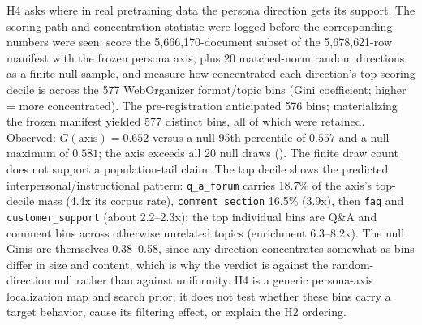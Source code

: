 H4 asks where in real pretraining data the persona direction gets its
support. The scoring path and concentration statistic were logged before
the corresponding numbers were seen: score the 5{,}666{,}170-document subset
of the 5{,}678{,}621-row manifest with the frozen persona axis, plus 20
matched-norm random directions as a finite null sample, and measure how
concentrated each direction's top-scoring decile is across the 577
WebOrganizer format/topic bins (Gini coefficient; higher = more
concentrated). The pre-registration anticipated 576 bins; materializing the
frozen manifest yielded 577 distinct bins, all of which were retained.
Observed: $G(\text{axis}) = 0.652$ versus a null 95th
percentile of $0.557$ and a null maximum of $0.581$; the axis exceeds all 20
null draws (). The finite draw count does not support a
population-tail claim. The top decile shows the predicted
interpersonal/instructional pattern: \texttt{q\_a\_forum} carries 18.7\%
of the axis's top-decile mass (4.4x its corpus rate),
\texttt{comment\_section} 16.5\% (3.9x), then \texttt{faq} and
\texttt{customer\_support} (about 2.2--2.3x); the top individual bins are
Q\&A and comment bins across otherwise unrelated topics (enrichment
6.3--8.2x). The null Ginis are themselves 0.38--0.58, since any direction
concentrates somewhat as bins differ in size and content, which is why the
verdict is against the random-direction null rather than against
uniformity. H4 is a generic persona-axis localization map and search
prior; it does not test whether these bins carry a target behavior, cause
its filtering effect, or explain the H2 ordering.
